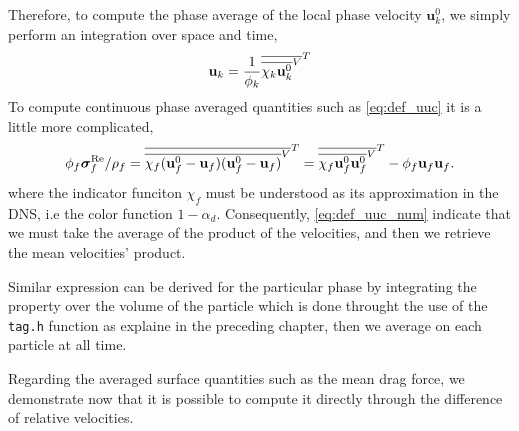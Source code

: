 Therefore, to compute the phase average of the local phase velocity $\textbf{u}_k^0$, we simply perform an integration over space and time, 
\begin{equation*}
    \textbf{u}_k = \frac{1}{\phi_k} \overline{\overline{\chi_k \textbf{u}_k^0}^V}^T
\end{equation*}
To compute continuous phase averaged quantities such as \ref{eq:def_uuc} it is a little more complicated,
\begin{equation}
    \phi_f \bm{\sigma}^{\text{Re}}_f /\rho_f
    = \overline{\overline{\chi_f (\textbf{u}_f^0 -\textbf{u}_f ) (\textbf{u}_f^0 -\textbf{u}_f)}^V}^T
    = \overline{\overline{\chi_f \textbf{u}_f^0 \textbf{u}_f^0}^V}^T
    -  \phi_f  \textbf{u}_f \textbf{u}_f.
    \label{eq:def_uuc_num} 
\end{equation}
where the indicator funciton $\chi_f$ must be understood as its approximation in the DNS, i.e the color function $1 - \alpha_d$. 
Consequently, \ref{eq:def_uuc_num} indicate that we must take the average of the product of the velocities, and then we retrieve the mean velocities' product. 

Similar expression can be derived for the particular phase by integrating the property over the volume of the particle which is done throught the use of the \texttt{tag.h} function as explaine in the preceding chapter, then we average on each particle at all time.

Regarding the averaged surface quantities such as the mean drag force, we demonstrate now that it is possible to compute it directly through the difference of relative velocities. 